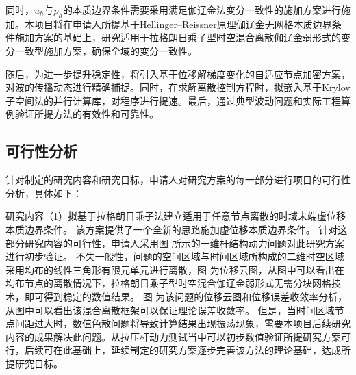 同时，$u_h$与$p_h$的本质边界条件需要采用满足伽辽金法变分一致性的施加方案进行施加。本项目将在申请人所提基于Hellinger--Reissner原理伽辽金无网格本质边界条件施加方案的基础上，研究适用于拉格朗日乘子型时空混合离散伽辽金弱形式的变分一致型施加方案，确保全域的变分一致性。

随后，为进一步提升稳定性，将引入基于位移解梯度变化的自适应节点加密方案，对波的传播动态进行精确捕捉。同时，在求解离散控制方程时，拟嵌入基于Krylov子空间法的并行计算库，对程序进行提速。最后，通过典型波动问题和实际工程算例验证所提方法的有效性和可靠性。

\subsection{可行性分析}
针对制定的研究内容和研究目标，申请人对研究方案的每一部分进行项目的可行性分析，具体如下：

研究内容（1）拟基于拉格朗日乘子法建立适用于任意节点离散的时域末端虚位移本质边界条件。
该方案提供了一个全新的思路施加虚位移本质边界条件。
针对这部分研究内容的可行性，申请人采用图  所示的一维杆结构动力问题对此研究方案进行初步验证。
不失一般性，问题的空间区域与时间区域所构成的二维时空区域采用均布的线性三角形有限元单元进行离散，图  为位移云图，从图中可以看出在均布节点的离散情况下，拉格朗日乘子型时空混合伽辽金弱形式无需分块网格技术，即可得到稳定的数值结果。
图  为该问题的位移云图和位移误差收敛率分析，从图中可以看出该混合离散框架可以保证理论误差收敛率。
但是，当时间区域节点间距过大时，数值色散问题将导致计算结果出现振荡现象，需要本项目后续研究内容的成果解决此问题。从拉压杆动力测试当中可以初步数值验证所提研究方案可行，后续可在此基础上，延续制定的研究方案逐步完善该方法的理论基础，达成所提研究目标。

